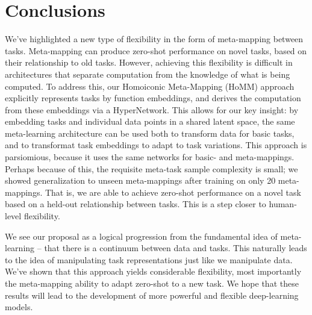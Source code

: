 \documentclass{article}
\begin{document}
\section{Conclusions}
\vspace{-0.5em} %
We've highlighted a new type of flexibility in the form of meta-mapping between tasks. Meta-mapping can produce zero-shot performance on novel tasks, based on their relationship to old tasks. However, achieving this flexibility is difficult in architectures that separate computation from the knowledge of what is being computed. To address this, our Homoiconic Meta-Mapping (HoMM) approach explicitly represents tasks by function embeddings, and derives the computation from these embeddings via a HyperNetwork. This allows for our key insight: by embedding tasks and individual data points in a shared latent space, the same meta-learning architecture can be used both to transform data for basic tasks, and to transformat task embeddings to adapt to task variations. This approach is parsiomious, because it uses the same networks for basic- and meta-mappings. Perhaps because of this, the requisite meta-task sample complexity is small; we showed generalization to unseen meta-mappings after training on only 20 meta-mappings. That is, we are able to achieve zero-shot performance on a novel task based on a held-out relationship between tasks. This is a step closer to human-level flexibility.\par
We see our proposal as a logical progression from the fundamental idea of meta-learning -- that there is a continuum between data and tasks. This naturally leads to the idea of manipulating task representations just like we manipulate data. We've shown that this approach yields considerable flexibility, most importantly the meta-mapping ability to adapt zero-shot to a new task. We hope that these results will lead to the development of more powerful and flexible deep-learning models. \par




\newpage

\end{document}

